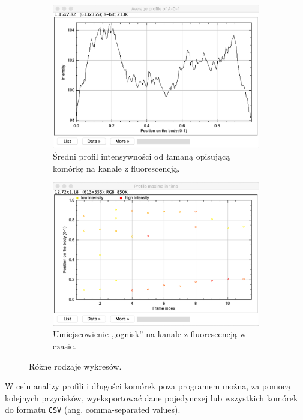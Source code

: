 \documentclass[declaration,shortabstract,mgr]{iithesis}
\begin{document}
\begin{figure}
  \begin{subfigure}[t]{.45\textwidth}
    \centering
    \includegraphics[width=\textwidth]{images/ui-plot-avg-profile.png}
    \caption{\centering Średni profil intensywności od łamaną opisującą komórkę na kanale z fluorescencją.}
  \end{subfigure}
  \hfill
  \begin{subfigure}[t]{.45\textwidth}
    \centering
    \includegraphics[width=\textwidth]{images/ui-plot-picks.png}
    \caption{\centering Umiejscowienie ,,ognisk'' na kanale z fluorescencją w czasie.}
  \end{subfigure}
  \hfill
  
  \caption{Różne rodzaje wykresów.}
  \label{fig:ui-plots}
\end{figure}

W celu analizy profili i długości komórek poza programem można, za pomocą kolejnych przycisków, wyeksportować dane pojedynczej lub wszystkich komórek do formatu \texttt{CSV} (ang. comma-separated values).
\end{document}
